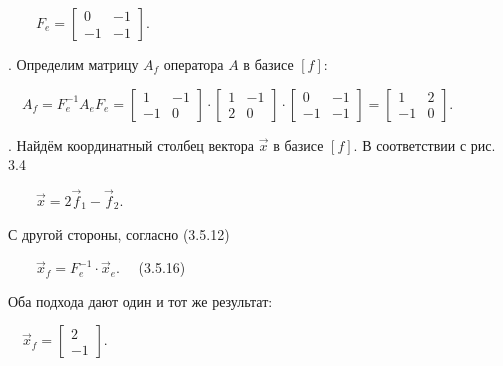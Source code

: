 \documentclass[a4paper]{article}
\begin{document}
{\begin{russian}\sffamily
\ \ \ \  $F_e=\left[\begin{matrix}0&-1\\-1&-1\end{matrix}\right]$.
\end{russian}}

{\begin{russian}. Определим матрицу  $A_f$ оператора  $A$ в базисе  $[f]$:
\end{russian}}

{\begin{russian}\sffamily
\ \  $A_f=F_e^{-1}A_eF_e=\left[\begin{matrix}1&-1\\-1&0\end{matrix}\right]\cdot
\left[\begin{matrix}1&-1\\2&0\end{matrix}\right]\cdot
\left[\begin{matrix}0&-1\\-1&-1\end{matrix}\right]=\left[\begin{matrix}1&2\\-1&0\end{matrix}\right]$.
\end{russian}}

{\begin{russian}. Найдём координатный столбец вектора  $\vec x$ в базисе  $[f]$. В соответствии с рис. 3.4
\end{russian}}

{\begin{russian}\sffamily
\ \ \ \  $\vec x=2\vec f_1-\vec f_2$.
\end{russian}}

{\begin{russian}\sffamily
С другой стороны, согласно (3.5.12)
\end{russian}}

{\begin{russian}\sffamily
\ \ \ \  $\vec x_f=F_e^{-1}\cdot \vec x_e$. \ \ (3.5.16) \ 
\end{russian}}

{\begin{russian}\sffamily
Оба подхода дают один и тот же результат:
\end{russian}}

{\begin{russian}\sffamily
\ \  $\vec x_f=\left[\begin{matrix}2\\-1\end{matrix}\right]$.
\end{russian}}
\end{document}
